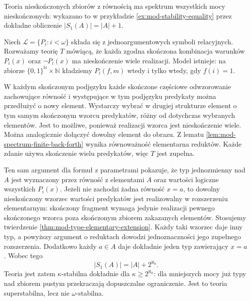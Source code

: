 \begin{przyklad}
\label{ex:mod-spectrum-all}
Teoria nieskończonych zbiorów z równością
ma spektrum wszystkich mocy nieskończonych:
wykazano to w przykładzie
\ref{ex:mod-stability-equality} przez dokładne
obliczenie $|S_1(A)|=|A|+1$.
\end{przyklad}

\begin{przyklad}
\label{ex:mod-spectrum-unary}
Niech $\mathcal L=\{P_i:i<\omega\}$ składa się
z jednoargumentowych symboli relacyjnych.
Rozważamy teorię $T$ mówiącą, że każda zgodna
skończona kombinacja warunków $P_i(x)$ oraz
$\neg P_i(x)$ ma nieskończenie wiele realizacji.
Model istnieje: na zbiorze
$\{0,1\}^{\mathbb N}\times\mathbb N$ kładziemy
$P_i(f,m)$ wtedy i tylko wtedy, gdy $f(i)=1$.

W każdym skończonym podjęzyku każde skończone
częściowe odwzorowanie zachowujące równość
i występujące w tym podjęzyku predykaty
można przedłużyć o nowy element.
Wystarczy wybrać w drugiej strukturze element
o tym samym skończonym wzorcu predykatów,
różny od dotychczas wybranych elementów.
Jest to możliwe, ponieważ realizacji wzorca
jest nieskończenie wiele. Można analogicznie
dołączyć dowolny element do obrazu.
Z lematu \ref{lem:mod-spectrum-finite-back-forth}
wynika równoważność elementarna reduktów.
Każde zdanie używa skończenie wielu predykatów,
więc $T$ jest zupełna.

Ten sam argument dla formuł z parametrami
pokazuje, że typ jednozmienny nad $A$ jest
wyznaczony przez równość z elementami $A$
oraz wartości logiczne wszystkich $P_i(x)$.
Jeżeli nie zachodzi żadna równość $x=a$,
to dowolny nieskończony wzorzec wartości
predykatów jest realizowalny w rozszerzeniu
elementarnym: skończony fragment wymaga
jedynie realizacji pewnego skończonego wzorca
poza skończonym zbiorem zakazanych elementów.
Stosujemy twierdzenie
\ref{thm:mod-type-elementary-extension}.
Każdy taki wzorzec daje inny typ, a powyższy
argument o reduktach dowodzi jednoznaczności
jego zupełnego rozszerzenia.
Dodatkowo każdy $a\in A$ daje dokładnie
jeden typ zawierający $x=a$. Wobec tego
\[
|S_1(A)|=|A|+2^{\aleph_0}.
\]
Teoria jest zatem $\kappa$-stabilna dokładnie
dla $\kappa\geq 2^{\aleph_0}$:
dla mniejszych mocy już typy nad zbiorem
pustym przekraczają dopuszczalne ograniczenie.
Jest to teoria superstabilna, lecz
nie $\omega$-stabilna.
\end{przyklad}

